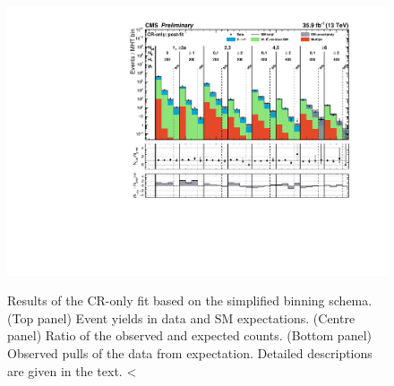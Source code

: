 \begin{figure}[h!]
  \centering
  \caption{Results of the CR-only fit based on the simplified binning
    schema. (Top panel) Event yields in data and SM
    expectations. (Centre panel) Ratio of the observed and expected
    counts. (Bottom panel) Observed pulls of the data from
    expectation. Detailed descriptions are given in the text.
<  }
  \includegraphics[width=0.95\linewidth]{figures/mountainRangePlots/aggregated_bins/all_cr-only.pdf} 
  \label{fig:aggregated_results}
\end{figure}

